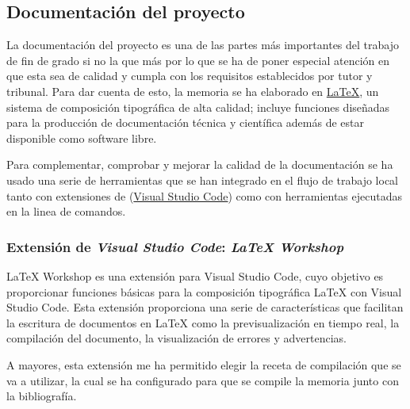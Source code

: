 \subsection{Documentación del proyecto}

La documentación del proyecto es una de las partes más importantes del trabajo de fin de grado si no la que más por lo que se ha de poner especial atención en que esta sea de calidad y cumpla con los requisitos establecidos por tutor y tribunal. Para dar cuenta de esto, la memoria se ha elaborado en \href{https://www.latex-project.org/}{\LaTeX{}}, un sistema de composición tipográfica de alta calidad; incluye funciones diseñadas para la producción de documentación técnica y científica además de estar disponible como software libre.

Para complementar, comprobar y mejorar la calidad de la documentación se ha usado una serie de herramientas que se han integrado en el flujo de trabajo local tanto con extensiones de (\href{https://code.visualstudio.com/}{Visual Studio Code}) como con herramientas ejecutadas en la linea de comandos.

\subsubsection{Extensión de \textit{Visual Studio Code}: \textit{LaTeX Workshop}}

LaTeX Workshop es una extensión para Visual Studio Code, cuyo objetivo es proporcionar funciones básicas para la composición tipográfica LaTeX con Visual Studio Code. Esta extensión proporciona una serie de características que facilitan la escritura de documentos en LaTeX como la previsualización en tiempo real, la compilación del documento, la visualización de errores y advertencias.

A mayores, esta extensión me ha permitido elegir la receta de compilación que se va a utilizar, la cual se ha configurado para que se compile la memoria junto con la bibliografía.

